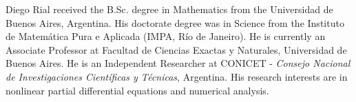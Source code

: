 \documentclass[journal]{IEEEtran}
\numberwithin{equation}{section}
\begin{document}
\begin{IEEEbiography}{Diego Rial} 
	received the B.Sc. degree in Mathematics from the Universidad de Buenos Aires, Argentina. His doctorate degree was in Science from the Instituto de Matem\'atica Pura e Aplicada (IMPA, Río de Janeiro).
	He is currently an Associate Professor at Facultad de Ciencias Exactas y Naturales, Universidad de Buenos Aires. He is an Independent Researcher at CONICET - \textit{Consejo Nacional de Investigaciones Cient\'ificas y T\'ecnicas}, Argentina. His research interests are in nonlinear partial differential equations and numerical analysis.
\end{IEEEbiography}
\end{document}
